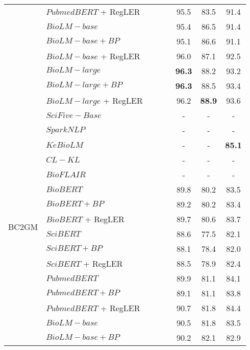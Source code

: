 \documentclass[11pt]{article}
\newcommand{\cmark}{\ding{51}}\newcommand{\xmark}{\ding{55}}\newcommand{\cross}{\ding{61}}\newcommand{\mb}[1]{\textcolor{red}{#1}}
\begin{document}
\begin{table*}[t]
\begin{adjustbox}{width=0.75\textwidth}
\begin{tabular}{ l l c c c c c c }
& $PubmedBERT$ + RegLER & \cmark & \cmark & \cmark & 95.5 & 83.5 & 91.4 \\
\cmidrule{2-8}
& $BioLM-base$ & \xmark & \xmark & \xmark & 95.4 & 86.5 & 91.4 \\
& $BioLM-base + {BP}$ & \xmark & \xmark & \xmark & 95.1 & 86.6 & 91.1 \\
& $BioLM-base$ + RegLER & \cmark & \cmark & \cmark & 96.0 & 87.1 & 92.5 \\
\cmidrule{2-8}
& $BioLM-large$ & \xmark & \xmark & \xmark & \textbf{96.3} & 88.2 & 93.2 \\
& $BioLM-large + {BP}$ & \xmark & \xmark & \xmark & \textbf{96.3} & 88.5 & 93.4 \\
& $BioLM-large$ + RegLER & \cmark & \cmark & \cmark & 96.2 & \textbf{88.9} & 93.6 \\
\midrule
\multirow{21}{*}{BC2GM}
& $SciFive-Base$ & \xmark & \xmark & \xmark & - & - & - \\
& $SparkNLP$ & \xmark & \xmark & \xmark & - & - & -  \\
& $KeBioLM$ & \xmark & \xmark & \xmark & - & - & \textbf{85.1}  \\
& $CL - KL$ & \xmark & \xmark & \xmark & - & - & -  \\
& $BioFLAIR$ & \xmark & \xmark & \xmark & - & - & - \\
\cmidrule{2-8}
& $BioBERT$ & \xmark & \xmark & \xmark & 89.8 & 80.2 & 83.5 \\
& $BioBERT + {BP}$ & \xmark & \xmark & \xmark & 89.2 & 80.2 &  83.4 \\
& $BioBERT$ + RegLER & \cmark & \cmark & \cmark & 89.7 & 80.6 & 83.7 \\
\cmidrule{2-8}
& $SciBERT$ & \xmark & \xmark & \xmark & 88.6 & 77.5 & 82.1 \\
& $SciBERT + {BP}$ & \xmark & \xmark & \xmark & 88.1 & 78.4 & 82.0 \\
& $SciBERT$ + RegLER & \cmark & \cmark & \cmark & 88.5 & 78.9 & 82.4 \\
\cmidrule{2-8}
& $PubmedBERT$ & \xmark & \xmark & \xmark & 89.9 & 81.1 & 84.1 \\
& $PubmedBERT + {BP}$ & \xmark & \xmark & \xmark & 89.1 & 81.1 & 83.8 \\
& $PubmedBERT$ + RegLER & \cmark & \cmark & \cmark & 90.7 & 81.8 & 84.4 \\
\cmidrule{2-8}
& $BioLM-base$ & \xmark & \xmark & \xmark & 90.5 & 81.8 & 83.5 \\
& $BioLM-base + {BP}$ & \xmark & \xmark & \xmark & 90.2 & 82.1 & 82.9 \\

\end{tabular}
\end{adjustbox}
\end{table*}
\end{document}
